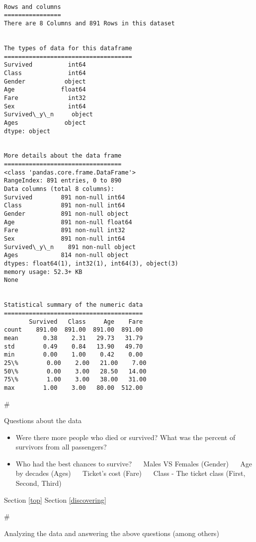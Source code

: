 \documentclass[11pt]{article}
\providecommand{\tightlist}{%
      \setlength{\itemsep}{0pt}\setlength{\parskip}{0pt}}
\begin{document}
    \begin{Verbatim}[commandchars=\\\{\}]

Rows and columns
================
There are 8 Columns and 891 Rows in this dataset


The types of data for this dataframe
====================================
Survived          int64
Class             int64
Gender           object
Age             float64
Fare              int32
Sex               int64
Survived\_y\_n     object
Ages             object
dtype: object


More details about the data frame
=================================
<class 'pandas.core.frame.DataFrame'>
RangeIndex: 891 entries, 0 to 890
Data columns (total 8 columns):
Survived        891 non-null int64
Class           891 non-null int64
Gender          891 non-null object
Age             891 non-null float64
Fare            891 non-null int32
Sex             891 non-null int64
Survived\_y\_n    891 non-null object
Ages            814 non-null object
dtypes: float64(1), int32(1), int64(3), object(3)
memory usage: 52.3+ KB
None


Statistical summary of the numeric data
=======================================
       Survived   Class     Age    Fare
count    891.00  891.00  891.00  891.00
mean       0.38    2.31   29.73   31.79
std        0.49    0.84   13.90   49.70
min        0.00    1.00    0.42    0.00
25\%        0.00    2.00   21.00    7.00
50\%        0.00    3.00   28.50   14.00
75\%        1.00    3.00   38.00   31.00
max        1.00    3.00   80.00  512.00

    \end{Verbatim}

    \#

Questions about the data

    \begin{itemize}
\tightlist
\item
  Were there more people who died or survived? What was the percent of
  survivors from all passengers?
\item
  Who had the best chances to survive? ~ ~{Males VS Females (Gender)} ~
  ~{Age by decades (Ages)} ~ ~{Ticket's cost (Fare)} ~ ~{Class - The
  ticket class (First, Second, Third)}
\end{itemize}

    Section \ref{top} Section \ref{discovering}

     \#

Analyzing the data and answering the above questions (among others)
\end{document}
